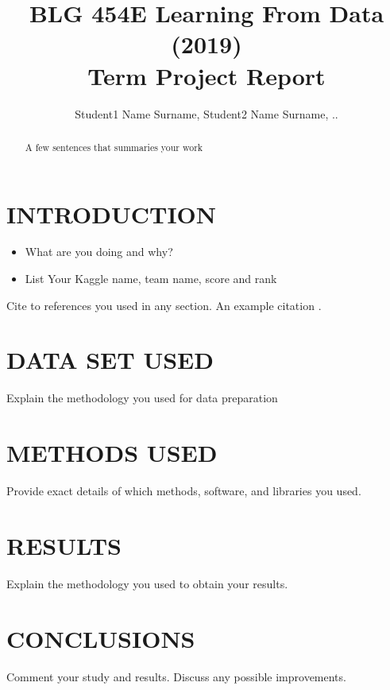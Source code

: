 \documentclass[a4paper, 10pt, conference]{ieeeconf}
\title{\LARGE \bf
BLG 454E Learning From Data (2019)\\ Term Project Report
}
\author{Student1 Name Surname, Student2 Name Surname, ..
}
\begin{document}
\maketitle
\thispagestyle{empty}
\pagestyle{empty}

\begin{abstract}
A few sentences that summaries your work
\end{abstract}

\section{INTRODUCTION}
\begin{itemize}
\item What are you doing and why?
\item List Your Kaggle name, team name, score and rank
\end{itemize}

Cite to references you used in any section. 
An example citation \cite{Watt2016_MLR}.

\section{DATA SET USED}
Explain the methodology you used for data preparation

\section{METHODS USED}
Provide exact details of which methods, software, and libraries you used. 

\section{RESULTS}
Explain the methodology you used to obtain your results.

\section{CONCLUSIONS}
Comment your study and results. Discuss any possible improvements.




\end{document}

